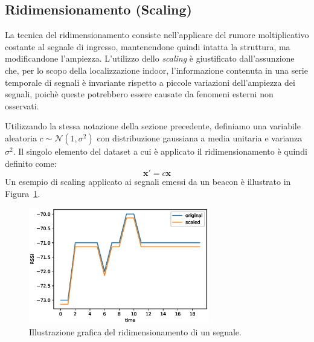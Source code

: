 \subsection{Ridimensionamento (Scaling)}
La tecnica del ridimensionamento consiste nell'applicare del rumore
moltiplicativo costante al segnale di ingresso, mantenendone quindi intatta la
struttura, ma modificandone l'ampiezza. L'utilizzo dello \emph{scaling} è
giustificato dall'assunzione che, per lo scopo della localizzazione indoor,
l'informazione contenuta in una serie temporale di segnali è invariante
rispetto a piccole variazioni dell'ampiezza dei segnali, poichè queste
potrebbero essere causate da fenomeni esterni non osservati.

Utilizzando la stessa notazione della sezione precedente, definiamo una
variabile aleatoria \(c \sim \mathcal{N}(1, \sigma^2)\) con distribuzione
gaussiana a media unitaria e varianza \(\sigma^2\). Il singolo elemento del
dataset a cui è applicato il ridimensionamento è quindi definito come:
\[ \bm x' = c \bm x \] 
Un esempio di scaling applicato ai segnali emessi da un beacon è illustrato in
Figura~\ref{fig:scaling}.
\begin{figure}[!htp]
  \centering\includegraphics[width=0.7\textwidth]{./img/scaling.eps}
  \caption{Illustrazione grafica del ridimensionamento di un segnale.}%
  \label{fig:scaling}%
\end{figure}

